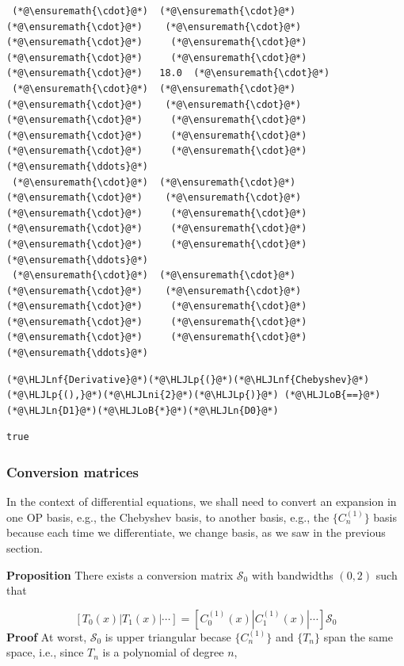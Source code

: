 \documentclass[12pt,a4paper]{article}
\newcommand{\HLJLn}[1]{#1}
\newcommand{\HLJLnf}[1]{\textcolor[RGB]{66,102,213}{#1}}
\newcommand{\HLJLni}[1]{\textcolor[RGB]{59,151,46}{#1}}
\newcommand{\HLJLoB}[1]{\textcolor[RGB]{102,102,102}{\textbf{#1}}}
\newcommand{\HLJLp}[1]{#1}
\begin{document}
\begin{lstlisting}
 (*@\ensuremath{\cdot}@*)  (*@\ensuremath{\cdot}@*)   (*@\ensuremath{\cdot}@*)    (*@\ensuremath{\cdot}@*)    (*@\ensuremath{\cdot}@*)     (*@\ensuremath{\cdot}@*)     (*@\ensuremath{\cdot}@*)     (*@\ensuremath{\cdot}@*)     (*@\ensuremath{\cdot}@*)   18.0  (*@\ensuremath{\cdot}@*)
 (*@\ensuremath{\cdot}@*)  (*@\ensuremath{\cdot}@*)   (*@\ensuremath{\cdot}@*)    (*@\ensuremath{\cdot}@*)    (*@\ensuremath{\cdot}@*)     (*@\ensuremath{\cdot}@*)     (*@\ensuremath{\cdot}@*)     (*@\ensuremath{\cdot}@*)     (*@\ensuremath{\cdot}@*)     (*@\ensuremath{\cdot}@*)   (*@\ensuremath{\ddots}@*)
 (*@\ensuremath{\cdot}@*)  (*@\ensuremath{\cdot}@*)   (*@\ensuremath{\cdot}@*)    (*@\ensuremath{\cdot}@*)    (*@\ensuremath{\cdot}@*)     (*@\ensuremath{\cdot}@*)     (*@\ensuremath{\cdot}@*)     (*@\ensuremath{\cdot}@*)     (*@\ensuremath{\cdot}@*)     (*@\ensuremath{\cdot}@*)   (*@\ensuremath{\ddots}@*)
 (*@\ensuremath{\cdot}@*)  (*@\ensuremath{\cdot}@*)   (*@\ensuremath{\cdot}@*)    (*@\ensuremath{\cdot}@*)    (*@\ensuremath{\cdot}@*)     (*@\ensuremath{\cdot}@*)     (*@\ensuremath{\cdot}@*)     (*@\ensuremath{\cdot}@*)     (*@\ensuremath{\cdot}@*)     (*@\ensuremath{\cdot}@*)   (*@\ensuremath{\ddots}@*)
\end{lstlisting}


\begin{lstlisting}
(*@\HLJLnf{Derivative}@*)(*@\HLJLp{(}@*)(*@\HLJLnf{Chebyshev}@*)(*@\HLJLp{(),}@*)(*@\HLJLni{2}@*)(*@\HLJLp{)}@*) (*@\HLJLoB{==}@*) (*@\HLJLn{D1}@*)(*@\HLJLoB{*}@*)(*@\HLJLn{D0}@*)
\end{lstlisting}

\begin{lstlisting}
true
\end{lstlisting}


\subsubsection{Conversion matrices}
In the context of differential equations, we shall need to convert an expansion in one OP basis, e.g., the Chebyshev basis, to another basis, e.g., the $\{ C_n^{(1)}\}$ basis because each time we differentiate, we change basis, as we saw in the previous section.

\textbf{Proposition} There exists a conversion matrix $\mathcal{S}_0$ with bandwidths $(0,2)$ such that

\[
\left[ T_0(x) | T_1(x) | \cdots  \right] =  \left[ C^{(1)}_0(x) | C^{(1)}_1(x) | \cdots  \right]\mathcal{S}_0
\]
\textbf{Proof} At worst, $\mathcal{S}_0$ is upper triangular becase  $\{ C_n^{(1)}\}$ and $\{ T_n\}$ span the same space, i.e., since $T_n$ is a polynomial of degree $n$,
\end{document}
